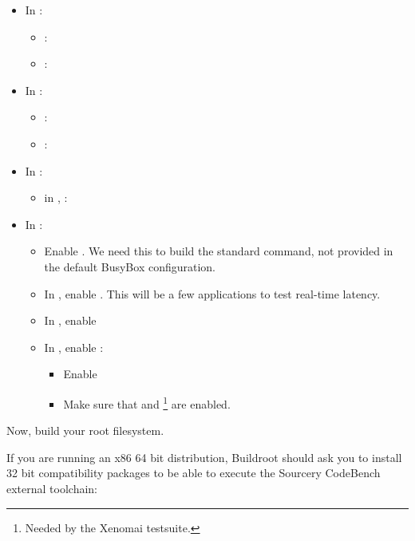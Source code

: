 \begin{itemize}
\item In :
   \begin{itemize}
   \item {}: 
   \item {}: 
   \end{itemize}
\item In :
   \begin{itemize}
   \item {}: 
   \item {}: 
   \end{itemize}
\item In :
   \begin{itemize}
   \item in ,  : 
   \end{itemize}
\item In :
   \begin{itemize}
   \item Enable .
         We need this to build the standard  command, not
         provided in the default BusyBox configuration.
   \item In , enable
         . This will be a few applications to test
         real-time latency.
   \item In , enable 
   \item In , enable :
         \begin{itemize}
         \item Enable 
	 \item Make sure that  and
	       \footnote{Needed by
	       the Xenomai testsuite.} are enabled.
  	 \end{itemize}
   \end{itemize}
\end{itemize}

Now, build your root filesystem.

If you are running an x86 64 bit distribution, Buildroot should ask
you to install 32 bit compatibility packages to be able to execute the
Sourcery CodeBench external toolchain:

